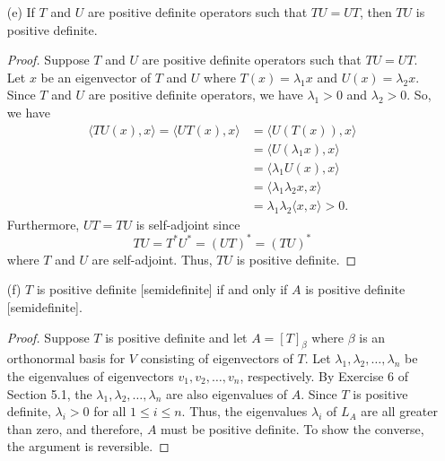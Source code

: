 \begin{enumerate}
\begin{proof}
        \end{proof}
    \item[(e)] If \( T  \) and \( U  \) are positive definite operators such that \( TU = UT  \), then \( TU \) is positive definite.
        \begin{proof}
        Suppose \( T  \) and \( U  \) are positive definite operators such that \( TU = UT  \). Let \( x \) be an eigenvector of \( T  \) and \( U  \) where \( T(x) = {\lambda}_{1}x  \) and \( U(x) = {\lambda}_{2}x  \). Since \( T  \) and \( U  \) are positive definite operators, we have \( {\lambda}_{1} > 0  \) and \( {\lambda}_{2} > 0  \). So, we have
        \begin{align*}
            \langle TU(x) , x  \rangle = \langle UT(x) , x  \rangle &= \langle U(T(x)) , x  \rangle \\
                                                                    &= \langle U({\lambda}_{1} x ) , x  \rangle \\
                                                                    &= \langle {\lambda}_{1} U(x) , x  \rangle \\
                                                                    &= \langle {\lambda}_{1} {\lambda}_{2} x  , x  \rangle \\
                                                                    &= {\lambda}_{1} {\lambda}_{2} \langle x  , x  \rangle >0. 
        \end{align*}
        Furthermore, \( UT = TU  \) is self-adjoint since 
        \[  TU = T^{*}U^{*} = (UT)^{*} = (TU)^{*} \] where \( T  \) and \( U  \) are self-adjoint. Thus, \( TU  \) is positive definite.
        \end{proof}
    \item[(f)] \( T  \) is positive definite [semidefinite] if and only if \( A  \) is positive definite [semidefinite].
        \begin{proof}
            Suppose \( T  \) is positive definite and let \( A = [T]_{\beta} \) where \( \beta  \) is an orthonormal basis for \( V  \) consisting of eigenvectors of \( T  \). Let \( {\lambda}_{1}, {\lambda}_{2}, \dots, {\lambda}_{n} \) be the eigenvalues of eigenvectors \( {v}_{1}, {v}_{2}, \dots, {v}_{n} \), respectively. By Exercise 6 of Section 5.1, the \( {\lambda}_{1}, {\lambda}_{2}, \dots, {\lambda}_{n} \) are also eigenvalues of \( A  \). Since \( T  \) is positive definite, \( {\lambda}_{i} > 0  \) for all \( 1 \leq i \leq n  \). Thus, the eigenvalues \( {\lambda}_{i} \) of \( {L}_{A}  \) are all greater than zero, and therefore, \( A  \) must be positive definite. To show the converse, the argument is reversible. 
        \end{proof}
\end{enumerate}

